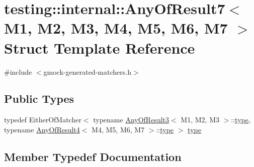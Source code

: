 \hypertarget{structtesting_1_1internal_1_1AnyOfResult7}{}\section{testing\+::internal\+::Any\+Of\+Result7$<$ M1, M2, M3, M4, M5, M6, M7 $>$ Struct Template Reference}
\label{structtesting_1_1internal_1_1AnyOfResult7}


{\ttfamily \#include $<$gmock-\/generated-\/matchers.\+h$>$}

\subsection*{Public Types}
\begin{DoxyCompactItemize}
\item 
typedef Either\+Of\+Matcher$<$ typename \mbox{\hyperlink{structtesting_1_1internal_1_1AnyOfResult3}{Any\+Of\+Result3}}$<$ M1, M2, M3 $>$\+::\mbox{\hyperlink{structtesting_1_1internal_1_1AnyOfResult7_a976873478921520833464a86f840abe8}{type}}, typename \mbox{\hyperlink{structtesting_1_1internal_1_1AnyOfResult4}{Any\+Of\+Result4}}$<$ M4, M5, M6, M7 $>$\+::\mbox{\hyperlink{structtesting_1_1internal_1_1AnyOfResult7_a976873478921520833464a86f840abe8}{type}} $>$ \mbox{\hyperlink{structtesting_1_1internal_1_1AnyOfResult7_a976873478921520833464a86f840abe8}{type}}
\end{DoxyCompactItemize}


\subsection{Member Typedef Documentation}
\mbox{\label{structtesting_1_1internal_1_1AnyOfResult7_a976873478921520833464a86f840abe8}} 
